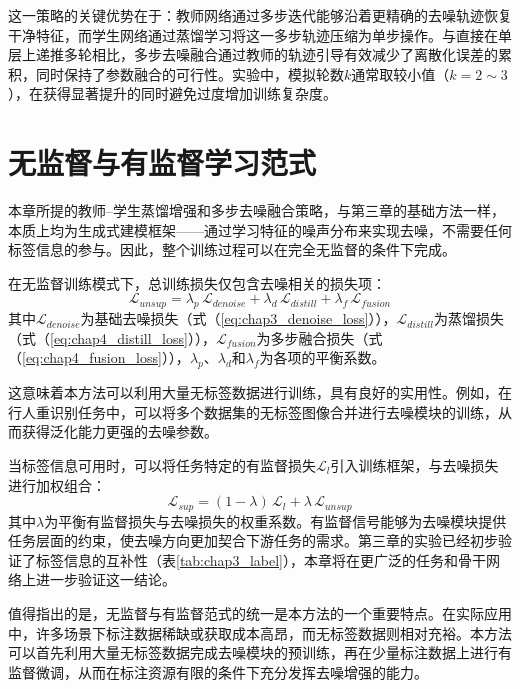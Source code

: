 这一策略的关键优势在于：教师网络通过多步迭代能够沿着更精确的去噪轨迹恢复干净特征，而学生网络通过蒸馏学习将这一多步轨迹压缩为单步操作。与直接在单层上递推多轮相比，多步去噪融合通过教师的轨迹引导有效减少了离散化误差的累积，同时保持了参数融合的可行性。实验中，模拟轮数$k$通常取较小值（$k = 2 \sim 3$），在获得显著提升的同时避免过度增加训练复杂度。

\section{无监督与有监督学习范式}
\label{sec:chap4_paradigm}

本章所提的教师--学生蒸馏增强和多步去噪融合策略，与第三章的基础方法一样，本质上均为生成式建模框架——通过学习特征的噪声分布来实现去噪，不需要任何标签信息的参与。因此，整个训练过程可以在完全无监督的条件下完成。

在无监督训练模式下，总训练损失仅包含去噪相关的损失项：
\begin{equation}
\mathcal{L}_{unsup} = \lambda_p\,\mathcal{L}_{denoise} + \lambda_d\,\mathcal{L}_{distill} + \lambda_f\,\mathcal{L}_{fusion}
\label{eq:chap4_unsup}
\end{equation}
其中$\mathcal{L}_{denoise}$为基础去噪损失（式（\ref{eq:chap3_denoise_loss}）），$\mathcal{L}_{distill}$为蒸馏损失（式（\ref{eq:chap4_distill_loss}）），$\mathcal{L}_{fusion}$为多步融合损失（式（\ref{eq:chap4_fusion_loss}）），$\lambda_p$、$\lambda_d$和$\lambda_f$为各项的平衡系数。

这意味着本方法可以利用大量无标签数据进行训练，具有良好的实用性。例如，在行人重识别任务中，可以将多个数据集的无标签图像合并进行去噪模块的训练，从而获得泛化能力更强的去噪参数。

当标签信息可用时，可以将任务特定的有监督损失$\mathcal{L}_l$引入训练框架，与去噪损失进行加权组合：
\begin{equation}
\mathcal{L}_{sup} = (1-\lambda)\,\mathcal{L}_l + \lambda\,\mathcal{L}_{unsup}
\label{eq:chap4_sup}
\end{equation}
其中$\lambda$为平衡有监督损失与去噪损失的权重系数。有监督信号能够为去噪模块提供任务层面的约束，使去噪方向更加契合下游任务的需求。第三章的实验已经初步验证了标签信息的互补性（表\ref{tab:chap3_label}），本章将在更广泛的任务和骨干网络上进一步验证这一结论。

值得指出的是，无监督与有监督范式的统一是本方法的一个重要特点。在实际应用中，许多场景下标注数据稀缺或获取成本高昂，而无标签数据则相对充裕。本方法可以首先利用大量无标签数据完成去噪模块的预训练，再在少量标注数据上进行有监督微调，从而在标注资源有限的条件下充分发挥去噪增强的能力。


